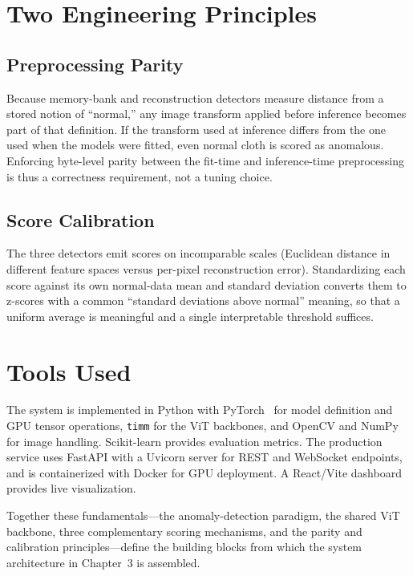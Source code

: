 \section{Two Engineering Principles}

\subsection{Preprocessing Parity}
Because memory-bank and reconstruction detectors measure distance from a stored notion of ``normal,'' any image transform applied before inference becomes part of that definition. If the transform used at inference differs from the one used when the models were fitted, even normal cloth is scored as anomalous. Enforcing byte-level parity between the fit-time and inference-time preprocessing is thus a correctness requirement, not a tuning choice.

\subsection{Score Calibration}
The three detectors emit scores on incomparable scales (Euclidean distance in different feature spaces versus per-pixel reconstruction error). Standardizing each score against its own normal-data mean and standard deviation converts them to z-scores with a common ``standard deviations above normal'' meaning, so that a uniform average is meaningful and a single interpretable threshold suffices.

\section{Tools Used}

The system is implemented in Python with PyTorch~\cite{paszke2019pytorch} for model definition and GPU tensor operations, \texttt{timm} for the ViT backbones, and OpenCV and NumPy for image handling. Scikit-learn provides evaluation metrics. The production service uses FastAPI with a Uvicorn server for REST and WebSocket endpoints, and is containerized with Docker for GPU deployment. A React/Vite dashboard provides live visualization.

Together these fundamentals---the anomaly-detection paradigm, the shared ViT backbone, three complementary scoring mechanisms, and the parity and calibration principles---define the building blocks from which the system architecture in Chapter~3 is assembled.

